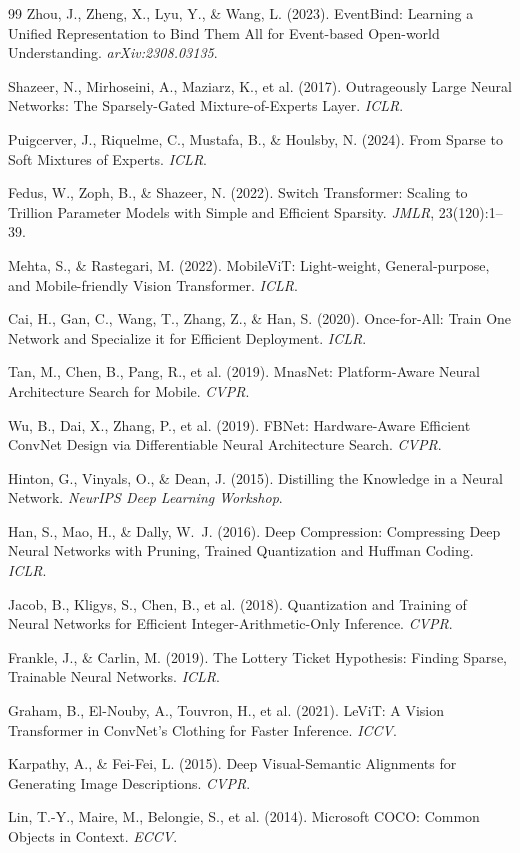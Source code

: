 \documentclass{article}
\begin{document}
{\begin{thebibliography}{99}
Zhou, J., Zheng, X., Lyu, Y., \& Wang, L. (2023). EventBind: Learning a Unified Representation to Bind Them All for Event-based Open-world Understanding. \emph{arXiv:2308.03135}.

Shazeer, N., Mirhoseini, A., Maziarz, K., et al. (2017). Outrageously Large Neural Networks: The Sparsely-Gated Mixture-of-Experts Layer. \emph{ICLR}.

Puigcerver, J., Riquelme, C., Mustafa, B., \& Houlsby, N. (2024). From Sparse to Soft Mixtures of Experts. \emph{ICLR}.

Fedus, W., Zoph, B., \& Shazeer, N. (2022). Switch Transformer: Scaling to Trillion Parameter Models with Simple and Efficient Sparsity. \emph{JMLR}, 23(120):1--39.

Mehta, S., \& Rastegari, M. (2022). MobileViT: Light-weight, General-purpose, and Mobile-friendly Vision Transformer. \emph{ICLR}.

Cai, H., Gan, C., Wang, T., Zhang, Z., \& Han, S. (2020). Once-for-All: Train One Network and Specialize it for Efficient Deployment. \emph{ICLR}.

Tan, M., Chen, B., Pang, R., et al. (2019). MnasNet: Platform-Aware Neural Architecture Search for Mobile. \emph{CVPR}.

Wu, B., Dai, X., Zhang, P., et al. (2019). FBNet: Hardware-Aware Efficient ConvNet Design via Differentiable Neural Architecture Search. \emph{CVPR}.

Hinton, G., Vinyals, O., \& Dean, J. (2015). Distilling the Knowledge in a Neural Network. \emph{NeurIPS Deep Learning Workshop}.

Han, S., Mao, H., \& Dally, W.~J. (2016). Deep Compression: Compressing Deep Neural Networks with Pruning, Trained Quantization and Huffman Coding. \emph{ICLR}.

Jacob, B., Kligys, S., Chen, B., et al. (2018). Quantization and Training of Neural Networks for Efficient Integer-Arithmetic-Only Inference. \emph{CVPR}.

Frankle, J., \& Carlin, M. (2019). The Lottery Ticket Hypothesis: Finding Sparse, Trainable Neural Networks. \emph{ICLR}.

Graham, B., El-Nouby, A., Touvron, H., et al. (2021). LeViT: A Vision Transformer in ConvNet's Clothing for Faster Inference. \emph{ICCV}.

Karpathy, A., \& Fei-Fei, L. (2015). Deep Visual-Semantic Alignments for Generating Image Descriptions. \emph{CVPR}.

Lin, T.-Y., Maire, M., Belongie, S., et al. (2014). Microsoft COCO: Common Objects in Context. \emph{ECCV}.

\end{thebibliography}
}
\end{document}
